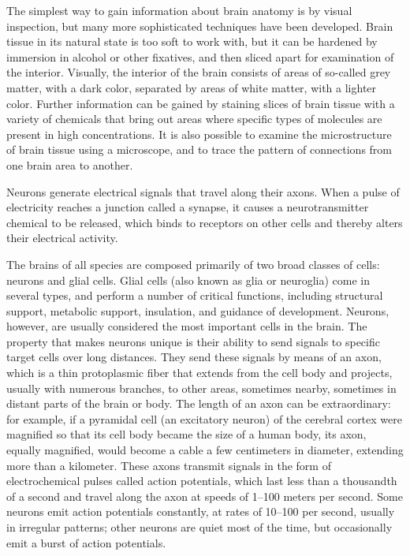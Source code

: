 \documentclass[]{book}
\begin{document}
The simplest way to gain information about brain anatomy is by visual inspection, but many more sophisticated techniques have been developed. Brain tissue in its natural state is too soft to work with, but it can be hardened by immersion in alcohol or other fixatives, and then sliced apart for examination of the interior. Visually, the interior of the brain consists of areas of so-called grey matter, with a dark color, separated by areas of white matter, with a lighter color. Further information can be gained by staining slices of brain tissue with a variety of chemicals that bring out areas where specific types of molecules are present in high concentrations. It is also possible to examine the microstructure of brain tissue using a microscope, and to trace the pattern of connections from one brain area to another.

Neurons generate electrical signals that travel along their axons. When a pulse of electricity reaches a junction called a synapse, it causes a neurotransmitter chemical to be released, which binds to receptors on other cells and thereby alters their electrical activity.

The brains of all species are composed primarily of two broad classes of cells: neurons and glial cells. Glial cells (also known as glia or neuroglia) come in several types, and perform a number of critical functions, including structural support, metabolic support, insulation, and guidance of development. Neurons, however, are usually considered the most important cells in the brain. The property that makes neurons unique is their ability to send signals to specific target cells over long distances. They send these signals by means of an axon, which is a thin protoplasmic fiber that extends from the cell body and projects, usually with numerous branches, to other areas, sometimes nearby, sometimes in distant parts of the brain or body. The length of an axon can be extraordinary: for example, if a pyramidal cell (an excitatory neuron) of the cerebral cortex were magnified so that its cell body became the size of a human body, its axon, equally magnified, would become a cable a few centimeters in diameter, extending more than a kilometer. These axons transmit signals in the form of electrochemical pulses called action potentials, which last less than a thousandth of a second and travel along the axon at speeds of 1--100 meters per second. Some neurons emit action potentials constantly, at rates of 10--100 per second, usually in irregular patterns; other neurons are quiet most of the time, but occasionally emit a burst of action potentials.
\end{document}

